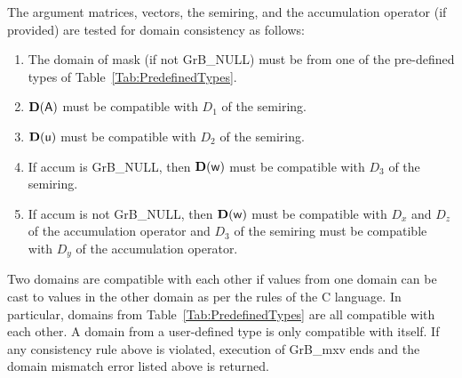 The argument matrices, vectors, the semiring, and the accumulation operator (if provided) 
are tested for domain consistency as follows:
\begin{enumerate}
	\item The domain of {\sf mask} (if not {\sf GrB\_NULL}) must be from one of the pre-defined types of Table~\ref{Tab:PredefinedTypes}.

	\item $\bold{D}({\sf A})$ must be compatible with $D_1$ of the semiring.

	\item $\bold{D}({\sf u})$ must be compatible with $D_2$ of the semiring.

	\item If {\sf accum} is {\sf GrB\_NULL}, then $\bold{D}({\sf w})$ must be compatible with $D_3$ of the semiring.

	\item If {\sf accum} is not {\sf GrB\_NULL}, then $\bold{D}({\sf w})$ must be compatible with $D_x$ and $D_z$ of the 
	accumulation operator and $D_3$ of the semiring must be compatible with $D_y$ of the accumulation operator.
\end{enumerate}
Two domains are compatible with each other if values from one domain can be cast 
to values in the other domain as per the rules of the C language.
In particular, domains from Table~\ref{Tab:PredefinedTypes} are all compatible 
with each other. A domain from a user-defined type is only compatible with itself.
If any consistency rule above is violated, execution of {\sf GrB\_mxv} ends and 
the domain mismatch error listed above is returned.

